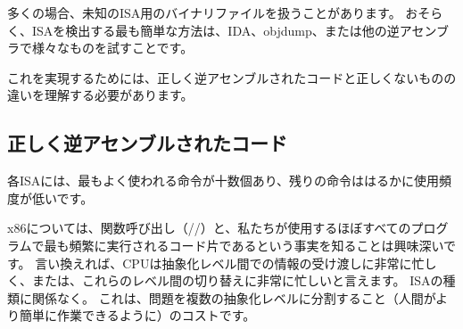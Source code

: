 \label{ISA_detect}

多くの場合、未知の\ac{ISA}用のバイナリファイルを扱うことがあります。
おそらく、\ac{ISA}を検出する最も簡単な方法は、IDA、objdump、または他の逆アセンブラで様々なものを試すことです。

これを実現するためには、正しく逆アセンブルされたコードと正しくないものの違いを理解する必要があります。

\renewcommand{\CURPATH}{digging_into_code/incorrect_disassembly}


\subsection{正しく逆アセンブルされたコード}
\label{correctly_disasmed_code}

各\ac{ISA}には、最もよく使われる命令が十数個あり、残りの命令ははるかに使用頻度が低いです。

x86については、関数呼び出し（\PUSH/\CALL/\ADD）と、私たちが使用するほぼすべてのプログラムで最も頻繁に実行されるコード片であるという事実を知ることは興味深いです。
言い換えれば、\ac{CPU}は抽象化レベル間での情報の受け渡しに非常に忙しく、または、これらのレベル間の切り替えに非常に忙しいと言えます。
\ac{ISA}の種類に関係なく。
これは、問題を複数の抽象化レベルに分割すること（人間がより簡単に作業できるように）のコストです。